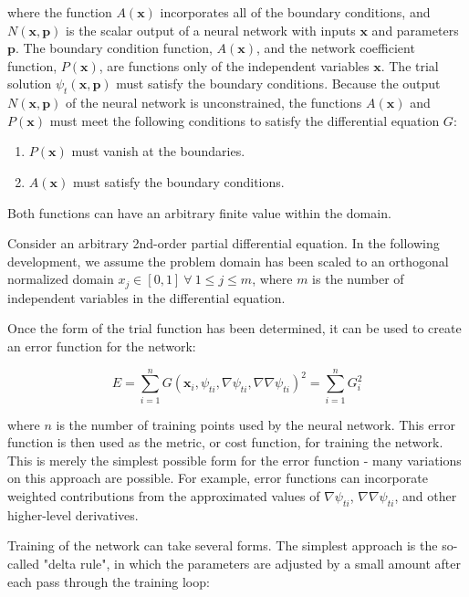 \documentclass{article}
\begin{document}
\noindent where the function $A(\mathbf x)$ incorporates all of the boundary conditions, and $N(\mathbf x, \mathbf p)$ is the scalar output of a neural network with inputs $\mathbf x$ and parameters $\mathbf p$. The boundary condition function, $A(\mathbf x)$, and the network coefficient function, $P(\mathbf x)$, are functions only of the independent variables $\mathbf x$. The trial solution $\psi_t(\mathbf x,\mathbf p)$ must satisfy the boundary conditions. Because the output $N(\mathbf x,\mathbf p)$ of the neural network is unconstrained, the functions $A(\mathbf x)$ and $P(\mathbf x)$ must meet the following conditions to satisfy the differential equation $G$:

\begin{enumerate}
  \item $P(\mathbf x)$ must vanish at the boundaries.
  \item $A(\mathbf x)$ must satisfy the boundary conditions.
\end{enumerate}

\noindent Both functions can have an arbitrary finite value within the domain.

Consider an arbitrary 2nd-order partial differential equation. In the following development, we assume the problem domain has been scaled to an orthogonal normalized domain $x_j \in [0,1] \ \forall \ 1 \le j \leq m$, where $m$ is the number of independent variables in the differential equation.

Once the form of the trial function has been determined, it can be used to create an error function for the network:

\begin{equation}
  E = \sum_{i=1}^n G(\mathbf x_i,\psi_{ti},\nabla \psi_{ti},\nabla \nabla \psi_{ti})^2 = \sum_{i=1}^n G_i^2
  \label{eq:errorfunction}
\end{equation}

\noindent where $n$ is the number of training points used by the neural network. This error function is then used as the metric, or cost function, for training the network. This is merely the simplest possible form for the error function - many variations on this approach are possible. For example, error functions can incorporate weighted contributions from the approximated values of $\nabla \psi_{ti}$, $\nabla \nabla \psi_{ti}$, and other higher-level derivatives.

Training of the network can take several forms. The simplest approach is the so-called "delta rule", in which the parameters are adjusted by a small amount after each pass through the training loop:
\end{document}
